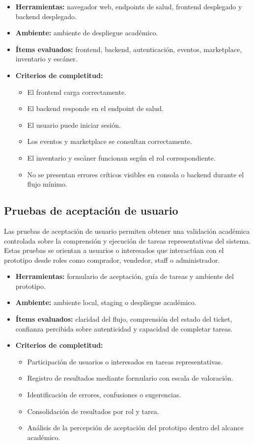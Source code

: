 \documentclass[12pt,letterpaper]{article}
\begin{document}
\begin{itemize}
    \item \textbf{Herramientas:} navegador web, endpoints de salud, frontend desplegado y backend desplegado.
    \item \textbf{Ambiente:} ambiente de despliegue académico.
    \item \textbf{Ítems evaluados:} frontend, backend, autenticación, eventos, marketplace, inventario y escáner.
    \item \textbf{Criterios de completitud:}
    \begin{itemize}
        \item El frontend carga correctamente.
        \item El backend responde en el endpoint de salud.
        \item El usuario puede iniciar sesión.
        \item Los eventos y marketplace se consultan correctamente.
        \item El inventario y escáner funcionan según el rol correspondiente.
        \item No se presentan errores críticos visibles en consola o backend durante el flujo mínimo.
    \end{itemize}
\end{itemize}

\subsection{Pruebas de aceptación de usuario}

Las pruebas de aceptación de usuario permiten obtener una validación académica controlada sobre la comprensión y ejecución de tareas representativas del sistema. Estas pruebas se orientan a usuarios o interesados que interactúan con el prototipo desde roles como comprador, vendedor, staff o administrador.

\begin{itemize}
    \item \textbf{Herramientas:} formulario de aceptación, guía de tareas y ambiente del prototipo.
    \item \textbf{Ambiente:} ambiente local, staging o despliegue académico.
    \item \textbf{Ítems evaluados:} claridad del flujo, comprensión del estado del ticket, confianza percibida sobre autenticidad y capacidad de completar tareas.
    \item \textbf{Criterios de completitud:}
    \begin{itemize}
        \item Participación de usuarios o interesados en tareas representativas.
        \item Registro de resultados mediante formulario con escala de valoración.
        \item Identificación de errores, confusiones o sugerencias.
        \item Consolidación de resultados por rol y tarea.
        \item Análisis de la percepción de aceptación del prototipo dentro del alcance académico.
    \end{itemize}
\end{itemize}
\end{document}
